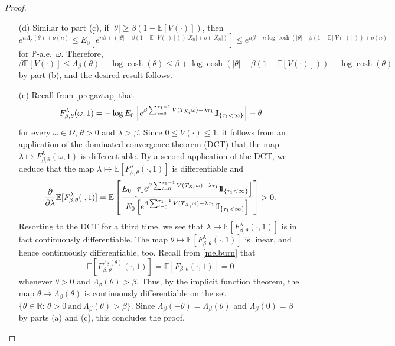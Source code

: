 \documentclass[a4paper]{amsart}
\numberwithin{equation}{section}
\theoremstyle{plain}
\theoremstyle{remark}
\begin{document}
\begin{proof}
\begin{itemize}
{		by appealing to} part (b).
		\item [(d)] Similar to part (c), if $|\theta| \ge \beta(1 - \mathbb{E}[V(\cdot)])$, then
		$$e^{n\Lambda_\beta(\theta) + o(n)} \le E_0\left[e^{n\beta + (|\theta| - \beta(1 - \mathbb{E}[V(\cdot)]))|X_n| + o(|X_n|)}\right] \le e^{n\beta + n\log\cosh(|\theta| - \beta(1 - \mathbb{E}[V(\cdot)])) + o(n)}$$
		for $\mathbb{P}$-a.e.\ $\omega$. Therefore, $$\beta\mathbb{E}[V(\cdot)] \le \Lambda_\beta(\theta) - \log\cosh(\theta) \le \beta + \log\cosh(|\theta| - \beta(1 - \mathbb{E}[V(\cdot)])) - \log\cosh(\theta)$$
		by part (b), and the desired result follows.
		\item [(e)] Recall from \eqref{pregaztap} that
		$$F_{\beta,\theta}^\lambda(\omega,1) = - \log E_0\left[e^{\beta\sum_{i=0}^{\tau_1-1}V(T_{X_i}\omega) - \lambda\tau_1}{{{\rm 1\mkern-1.5mu}\!{\rm I}}}_{\{\tau_1<\infty\}}\right] - \theta$$
		for every $\omega\in\Omega$, $\theta>0$ and $\lambda>\beta$. Since $0\le V(\cdot)\le 1$, it follows from an application of the dominated convergence theorem (DCT) that the map $\lambda\mapsto  F_{\beta,\theta}^\lambda(\omega,1)$ is differentiable. By a second application of the DCT, we deduce that the map $\lambda\mapsto  \mathbb{E}[F_{\beta,\theta}^\lambda(\cdot,1)]$ is differentiable and
		\begin{equation}\label{ustdest}
		\frac{\partial}{\partial\lambda}\mathbb{E}[F_{\beta,\theta}^\lambda(\cdot,1)] = \mathbb{E}\left[\frac{E_0\left[\tau_1e^{\beta\sum_{i=0}^{\tau_1-1}V(T_{X_i}\omega) - \lambda\tau_1}{{{\rm 1\mkern-1.5mu}\!{\rm I}}}_{\{\tau_1<\infty\}}\right]}{E_0\left[e^{\beta\sum_{i=0}^{\tau_1-1}V(T_{X_i}\omega) - \lambda\tau_1}{{{\rm 1\mkern-1.5mu}\!{\rm I}}}_{\{\tau_1<\infty\}}\right]}\right]>0.
		\end{equation}
		Resorting to the DCT for a third time, we see that $\lambda\mapsto  \mathbb{E}[F_{\beta,\theta}^\lambda(\cdot,1)]$ is in fact continuously differentiable.
		The map $\theta\mapsto\mathbb{E}[F_{\beta,\theta}^\lambda(\cdot,1)]$ is linear, and hence continuously differentiable, too. 
		Recall from \eqref{melburn} that
		\begin{equation}
		  \label{eq-star14}
		  \mathbb{E}[F_{\beta,\theta}^{\Lambda_\beta(\theta)}(\cdot,1)] = \mathbb{E}[F_{\beta,\theta}(\cdot,1)] = 0
		\end{equation}
		whenever $\theta>0$ and $\Lambda_\beta(\theta) > \beta$.
		Thus, by the implicit function theorem, the map $\theta\mapsto\Lambda_\beta(\theta)$ is continuously differentiable on the set $\{\theta\in\mathbb{R}:\,\theta>0\ \text{and}\ \Lambda_\beta(\theta)>\beta\}$. Since $\Lambda_\beta(-\theta) = \Lambda_\beta(\theta)$ and $\Lambda_\beta(0) = \beta$ by parts (a) and (c), this concludes the proof.\qedhere
	\end{itemize}
\end{proof}
\end{document}
